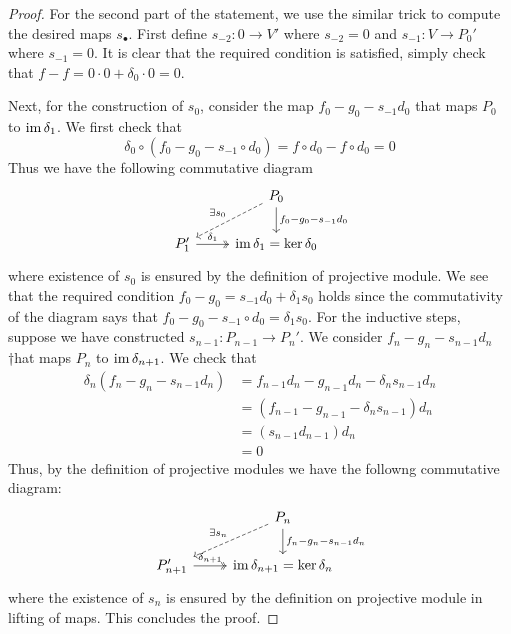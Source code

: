 \begin{proof}
	For the second part of the statement, we use the similar trick to compute the desired maps $s_\bullet$. First define $s_{-2}:0\to V'$ where $s_{-2}=0$ and $s_{-1}:V\to P_0'$ where $s_{-1}=0$. It is clear that the required condition is satisfied, simply check that $f-f = 0 \cdot 0 + \delta_0 \cdot 0 = 0$.

	Next, for the construction of $s_0$, consider the map $f_0- g_0-s_{-1}d_0$ that maps $P_0$ to $\operatorname{im} \delta_1$. We first check that
	\[\delta_0\circ (f_0 - g_0 -s_{-1}\circ d_0) = f\circ d_0 - f\circ d_0 = 0\]
	Thus we have the following commutative diagram
    \[\begin{tikzcd}[sep=small]
	&& {P_0} \\
	\\
	{P'_1} && {\im \delta_1 = \ker \delta_0}
	\arrow["{\exists s_0}"', dashed, from=1-3, to=3-1]
	\arrow["{f_0 - g_0 - s_{-1}d_0}", from=1-3, to=3-3]
	\arrow["{\delta_1}", two heads, from=3-1, to=3-3]
	\end{tikzcd}\]
	where existence of $s_0$ is ensured by the definition of projective module. We see that the required condition $f_0 - g_0 = s_{-1}d_0 + \delta_1s_0$ holds since the commutativity of the diagram says that $f_0 - g_0 -s_{-1}\circ d_0 = \delta_1s_0$. 
	For the inductive steps, suppose we have constructed $s_{n-1}:P_{n-1}\to P_n'$. We consider $f_n - g_n - s_{n-1}d_n$ †hat maps $P_n$ to $\operatorname{im} \delta_{n+1}$. We check that
	\begin{align*}
		\delta_n(f_n - g_n - s_{n-1}d_n) 
		&= f_{n-1}d_n-g_{n-1}d_n-\delta_n s_{n-1} d_n\\ 
		&= (f_{n-1}-g_{n-1}-\delta_n s_{n-1})d_n \\
		&= (s_{n-1} d_{n-1})d_n\\
		&= 0
	\end{align*}
	Thus, by the definition of projective modules we have the followng commutative diagram:
	\[\begin{tikzcd}[sep=small]
	&& {P_n} \\
	\\
	{P'_{n+1}} && {\im \delta_{n+1} = \ker \delta_n}
	\arrow["{\exists s_n}"', dashed, from=1-3, to=3-1]
	\arrow["{f_n - g_n - s_{n-1}d_n}", from=1-3, to=3-3]
	\arrow["{\delta_{n+1}}", two heads, from=3-1, to=3-3]
	\end{tikzcd}\]
	where the existence of $s_n$ is ensured by the definition on projective module in lifting of maps. This concludes the proof.
\end{proof}

